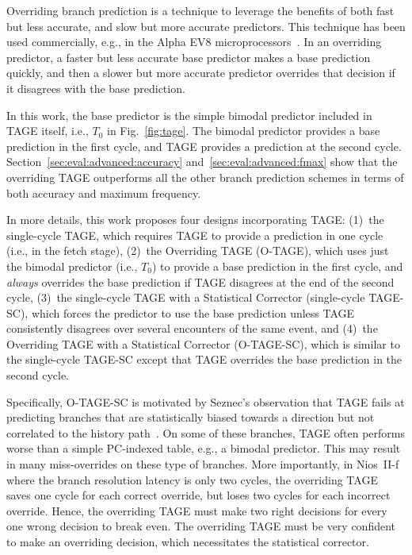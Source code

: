 Overriding branch prediction is a technique to leverage the benefits of both fast but less accurate, and slow but more accurate predictors. This technique has been used commercially, e.g., in the Alpha EV8 microprocessors~\cite{alphaEV8}. In an overriding predictor, a faster but less accurate base predictor makes a base prediction quickly, and then a slower but more accurate predictor overrides that decision if it disagrees with the base prediction. 

In this work, the base predictor is the simple bimodal predictor included in TAGE itself, i.e., $T_0$ in Fig.~\ref{fig:tage}. The bimodal predictor provides a base prediction in the first cycle, and TAGE provides a prediction at the second cycle. Section~\ref{sec:eval:advanced:accuracy} and~\ref{sec:eval:advanced:fmax} show that the overriding TAGE outperforms all the other branch prediction schemes in terms of both accuracy and maximum frequency.

In more details, this work proposes four designs incorporating TAGE:  (1)~the single-cycle TAGE, which requires TAGE to provide a prediction in one cycle (i.e., in the fetch stage), (2)~the Overriding TAGE (\mbox{O-TAGE}), which uses just the bimodal predictor (i.e., $T_0$) to provide a base prediction in the first cycle, and \textit{always} overrides the base prediction if TAGE disagrees at the end of the second cycle, (3)~the single-cycle TAGE with a Statistical Corrector (single-cycle \mbox{TAGE-SC}), which forces the predictor to use the base prediction unless TAGE consistently disagrees over several encounters of the same event, and (4)~the Overriding TAGE with a Statistical Corrector (\mbox{O-TAGE-SC}), which is similar to the single-cycle \mbox{TAGE-SC} except that TAGE overrides the base prediction in the second cycle.

Specifically, \mbox{O-TAGE-SC} is motivated by Seznec's observation that TAGE fails at predicting branches that are statistically biased towards a direction but not correlated to the history path~\cite{isltage}. On some of these branches, TAGE often performs worse than a simple PC-indexed table, e.g., a bimodal predictor. This may result in many miss-overrides on these type of branches. More importantly, in Nios~II-f where the branch resolution latency is only two cycles, the overriding TAGE saves one cycle for each correct override, but loses two cycles for each incorrect override. Hence, the overriding TAGE must make two right decisions for every one wrong decision to break even. The overriding TAGE must be very confident to make an overriding decision, which necessitates the statistical corrector.

